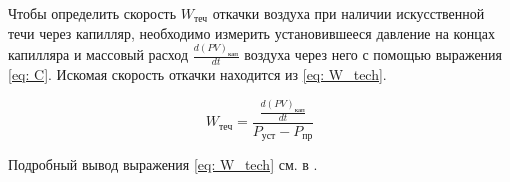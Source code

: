 Чтобы определить скорость $W_\text{теч}$ откачки воздуха при наличии искусственной течи через капилляр, необходимо измерить установившееся давление на концах капилляра и массовый расход $\frac{d(PV)_\text{кап}}{dt}$ воздуха через него с помощью выражения \eqref{eq: C}. Искомая скорость откачки находится из \eqref{eq: W_tech}.

\begin{equation}
    W_\text{теч} = \frac{\frac{d(PV)_\text{кап}}{dt}}{P_\text{уст} - P_\text{пр}} \label{eq: W_tech}
\end{equation}

Подробный вывод выражения \eqref{eq: W_tech} см. в .

